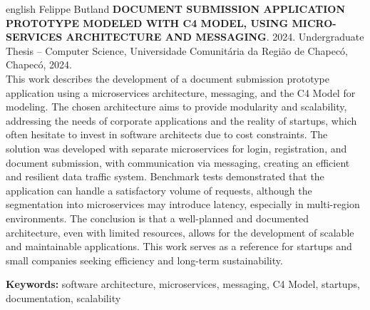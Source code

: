\begin{resumo}[Abstract]
 \begin{otherlanguage*}{english}
\noindent Felippe Butland  \textbf{DOCUMENT SUBMISSION APPLICATION PROTOTYPE MODELED WITH C4 MODEL, USING MICRO-SERVICES ARCHITECTURE AND MESSAGING}. 2024. Undergraduate Thesis – Computer Science, Universidade Comunitária da Região de Chapecó, Chapecó, 2024.\\

\noindent This work describes the development of a document submission prototype application using a microservices architecture, messaging, and the C4 Model for modeling. The chosen architecture aims to provide modularity and scalability, addressing the needs of corporate applications and the reality of startups, which often hesitate to invest in software architects due to cost constraints. The solution was developed with separate microservices for login, registration, and document submission, with communication via messaging, creating an efficient and resilient data traffic system.
Benchmark tests demonstrated that the application can handle a satisfactory volume of requests, although the segmentation into microservices may introduce latency, especially in multi-region environments. The conclusion is that a well-planned and documented architecture, even with limited resources, allows for the development of scalable and maintainable applications. This work serves as a reference for startups and small companies seeking efficiency and long-term sustainability.

\noindent \textbf{Keywords:} software architecture, microservices, messaging, C4 Model, startups, documentation, scalability
\end{otherlanguage*}


\end{resumo}
